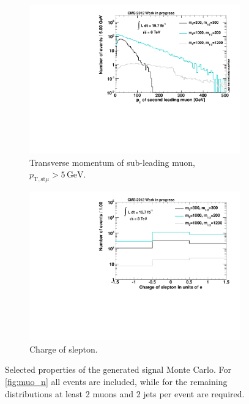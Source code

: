 \begin{figure}[!htbp]
  \ContinuedFloat
  \centering
  \begin{subfigure}[b]{0.495\textwidth}
    \centering
    \includegraphics[width=\textwidth]{plots/sig_muo_pt2.pdf}
    \caption{Transverse momentum of sub-leading muon, $p_{\text{T}, \text{st} \mu} > 5\,\text{GeV}$.\label{fig:sig_muo_pt2}}
  \end{subfigure}
  \begin{subfigure}[b]{0.495\textwidth}
    \centering
    \includegraphics[width=\textwidth]{plots/sig_slepton_charge.pdf}
    \caption{Charge of slepton.\label{fig:sig_slepton_charge}}
  \end{subfigure}
  \caption{Selected properties of the generated signal Monte Carlo. For \ref{fig:muo_n} all events are included, while for the remaining distributions at least 2 muons and 2 jets per event are required.}
  \label{fig:signal_properties}
\end{figure}


